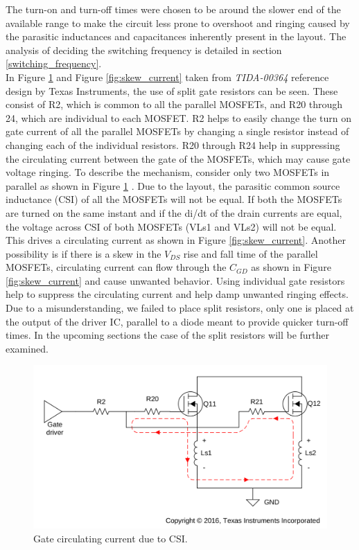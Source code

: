 The turn-on and turn-off times were chosen to be around the slower end of the available range to make the circuit less prone to overshoot and ringing caused by the parasitic inductances and capacitances inherently present in the layout. The analysis of deciding the switching frequency is detailed in section \ref{switching_frequency}. \\

In Figure \ref{fig:CSI_current} and Figure \ref{fig:skew_current} taken from \textit{TIDA-00364}\cite{TIDA-00364} reference design by Texas Instruments, the use of split gate resistors can be seen. These consist of R2, which is common to all the parallel MOSFETs, and R20 through 24, which are individual to each MOSFET. 
R2 helps to easily change the turn on gate current of all the parallel MOSFETs by changing a single resistor instead of changing each of the individual resistors. R20 through R24 help in suppressing the circulating current between the gate of the MOSFETs, which may cause gate voltage ringing. To describe the mechanism, consider only two MOSFETs in parallel as shown in Figure \ref{fig:CSI_current} . 
Due to the layout, the parasitic common source inductance (CSI) of all the MOSFETs will not be equal. If both the MOSFETs are turned on the same instant and if the di/dt of the drain currents are equal, the voltage across CSI of both MOSFETs (VLs1 and VLs2) will not be equal. This drives a circulating current as shown in Figure \ref{fig:skew_current}. 
Another possibility is if there is a skew in the $V_{DS}$ rise and fall time of the parallel MOSFETs, circulating current can flow through the $C_{GD}$ as shown in Figure \ref{fig:skew_current} and cause unwanted behavior. 
Using individual gate resistors help to suppress the circulating current and help damp unwanted ringing effects. Due to a misunderstanding, we failed to place split resistors, only one is placed at the output of the driver IC, parallel to a diode meant to provide quicker turn-off times. In the upcoming sections the case of the split resistors will be further examined.%

\begin{figure}[H]
	\centering
	\includegraphics[width=0.85\linewidth]{pictures/hardware/Driver_Board/CSI.png}
	\caption{Gate circulating current due to CSI.}
	\label{fig:CSI_current}
\end{figure}

